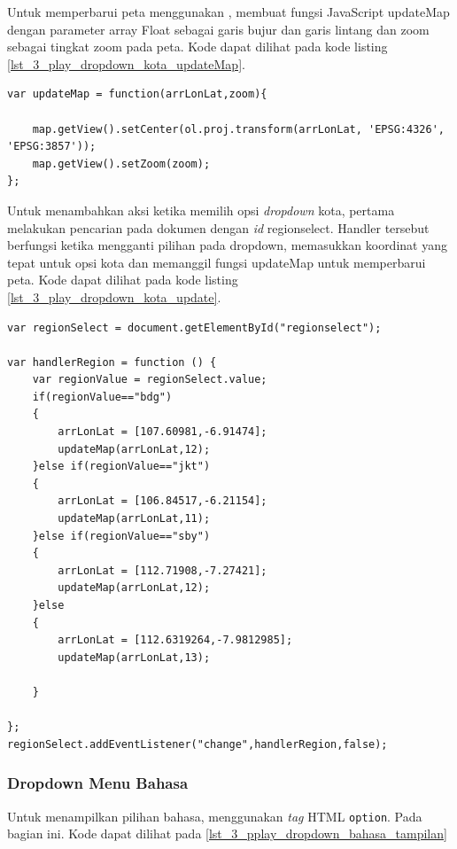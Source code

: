 Untuk memperbarui peta menggunakan \play, membuat fungsi JavaScript updateMap dengan parameter array Float sebagai garis bujur dan garis lintang dan zoom sebagai tingkat zoom pada peta. Kode dapat dilihat pada kode listing \ref{lst_3_play_dropdown_kota_updateMap}.

\begin{lstlisting}[caption=Fungsi JavaScript untuk memperbarui peta ,label = {lst_3_play_dropdown_kota_updateMap}]
var updateMap = function(arrLonLat,zoom){

    map.getView().setCenter(ol.proj.transform(arrLonLat, 'EPSG:4326', 'EPSG:3857'));
    map.getView().setZoom(zoom);
};
\end{lstlisting}

Untuk menambahkan aksi ketika memilih opsi \textit{dropdown} kota, pertama melakukan pencarian pada dokumen dengan \textit{id} regionselect. Handler tersebut berfungsi ketika mengganti pilihan pada dropdown, memasukkan koordinat yang tepat untuk opsi kota dan memanggil fungsi updateMap untuk memperbarui peta. Kode dapat dilihat pada kode listing \ref{lst_3_play_dropdown_kota_update}.

\begin{lstlisting}[caption=Fungsi JavaScript untuk menambahkan \textit{handler} ketika mengganti \textit{dropdown} kota ,label = {lst_3_play_dropdown_kota_update}]
var regionSelect = document.getElementById("regionselect");

var handlerRegion = function () {
    var regionValue = regionSelect.value;
    if(regionValue=="bdg")
    {
        arrLonLat = [107.60981,-6.91474];
        updateMap(arrLonLat,12);
    }else if(regionValue=="jkt")
    {
        arrLonLat = [106.84517,-6.21154];
        updateMap(arrLonLat,11);
    }else if(regionValue=="sby")
    {
        arrLonLat = [112.71908,-7.27421];
        updateMap(arrLonLat,12);
    }else
    {
        arrLonLat = [112.6319264,-7.9812985];
        updateMap(arrLonLat,13);

    }

};
regionSelect.addEventListener("change",handlerRegion,false);
\end{lstlisting}

\subsubsection{Dropdown Menu Bahasa}
Untuk menampilkan pilihan bahasa, menggunakan \textit{tag} HTML \verb!option!. Pada bagian ini. Kode dapat dilihat pada \ref{lst_3_pplay_dropdown_bahasa_tampilan}

